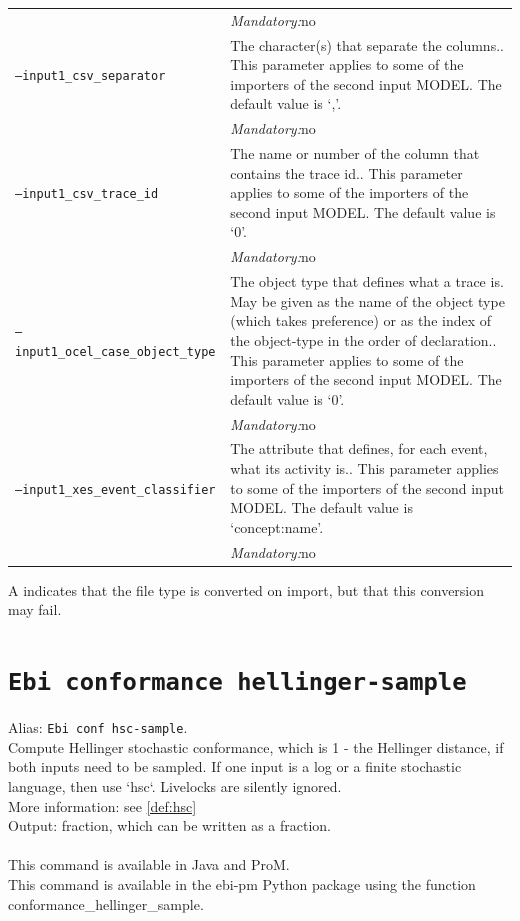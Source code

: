 {\begin{tabularx}{\linewidth}{lX}
&\textit{Mandatory:}\quad no\\
\texttt{--input1\_csv\_separator} & The character(s) that separate the columns.. This parameter applies to some of the importers of the second input MODEL. The default value is `,'.\\
&\textit{Mandatory:}\quad no\\
\texttt{--input1\_csv\_trace\_id} & The name or number of the column that contains the trace id.. This parameter applies to some of the importers of the second input MODEL. The default value is `0'.\\
&\textit{Mandatory:}\quad no\\
\texttt{--input1\_ocel\_case\_object\_type} & The object type that defines what a trace is. May be given as the name of the object type (which takes preference) or as the index of the object-type in the order of declaration.. This parameter applies to some of the importers of the second input MODEL. The default value is `0'.\\
&\textit{Mandatory:}\quad no\\
\texttt{--input1\_xes\_event\_classifier} & The attribute that defines, for each event, what its activity is.. This parameter applies to some of the importers of the second input MODEL. The default value is `concept:name'.\\
&\textit{Mandatory:}\quad no\\
\bottomrule
\end{tabularx}
A \textdagger{} indicates that the file type is converted on import, but that this conversion may fail.
\clearpage\section{\texttt{Ebi conformance hellinger-sample}}
\label{command:Ebi conformance hellinger-sample}
Alias: \texttt{Ebi conf hsc-sample}.\\
Compute Hellinger stochastic conformance, which is 1 - the Hellinger distance, if both inputs need to be sampled. 
        If one input is a log or a finite stochastic language, then use `hsc`.
        Livelocks are silently ignored.\\
More information: see \cref{def:hsc}~\\
\noindent Output: fraction, which can be written as a fraction.\\
\\This command is available in Java and ProM.
\\This command is available in the ebi-pm Python package using the function conformance\_hellinger\_sample.
}
